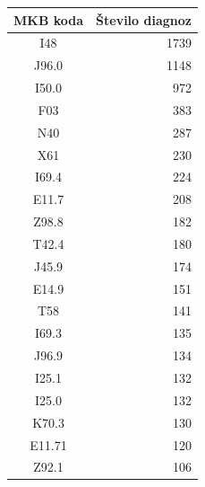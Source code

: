 \documentclass[a4paper,12pt]{report}
\begin{document}
\begin{center}
   \begin{tabular}{||c|r||}
      \hline
      MKB koda & Število diagnoz\\
      \hline
      \hline
      I48 & 1739\\
      J96.0 & 1148\\
      I50.0 & 972\\
      F03 & 383\\
      N40 & 287\\
      X61 & 230\\
      I69.4 & 224\\
      E11.7 & 208\\
      Z98.8 & 182\\
      T42.4 & 180\\
      J45.9 & 174\\
      E14.9 & 151\\
      T58 & 141\\
      I69.3 & 135\\
      J96.9 & 134\\
      I25.1 & 132\\
      I25.0 & 132\\
      K70.3 & 130\\
      E11.71 & 120\\
      Z92.1 & 106\\
      \hline

   \end{tabular}
\end{center}
\end{document}

